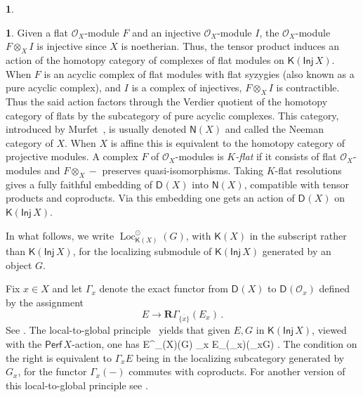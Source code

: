 \documentclass{amsart}
\let\oldequation\equation
\let\oldendequation\endequation
\renewenvironment{equation}{\linenomathNonumbers\oldequation}{\oldendequation\endlinenomath}
\newcommand{\dcat}[2][]{\cat{D}_{#1}(#2)}
\newcommand{\kinj}[1]{\cat{K}(\cat{Inj}\,#1)}
\newcommand{\perf}[1]{\mathsf{Perf}\,#1}
\newcommand{\mco}{\mathcal{O}}
\newcommand{\cat}[1]{{\mathsf{#1}}}
\newcommand{\Loc}{\operatorname{Loc}}
\newcounter{intro}
\theoremstyle{definition}
\newtheorem{chunk}[subsection]{}
\theoremstyle{remark}
\numberwithin{equation}{subsection}
\begin{document}
\begin{chunk}
\begin{chunk}
Given a flat $\mco_X$-module $F$ and an injective $\mco_X$-module $I$, the $\mco_X$-module $F\otimes_XI$ is injective since $X$ is noetherian. Thus, the tensor product induces an action of the homotopy category of complexes of flat modules on $\kinj X$. When $F$ is an acyclic complex of flat modules with flat syzygies (also known as a pure acyclic complex), and $I$ is a complex of injectives, $F\otimes_XI$ is contractible. Thus the said action factors through the Verdier quotient of the homotopy category of flats by the subcategory of pure acyclic complexes. This category, introduced by Murfet~\cite{Murfet:2007, Neeman:2010}, is usually denoted $\cat{N}(X)$ and called the Neeman category of $X$. When $X$ is affine this is equivalent to the homotopy category of projective modules. A complex $F$ of $\mco_X$-modules is \emph{$K$-flat} if it consists of flat $\mco_X$-modules and $F\otimes_X-$ preserves quasi-isomorphisms. Taking $K$-flat resolutions gives a fully faithful embedding of $\dcat X$ into $\cat N(X)$, compatible with tensor products and coproducts. Via this embedding one gets an action of $\dcat X$ on $\kinj X$.

In what follows, we write $\Loc^{\odot}_{\cat K(X)}(G)$, with $\cat K(X)$ in the subscript rather than $\kinj X$, for the localizing submodule of $\kinj X$ generated by an object $G$. 

Fix $x\in X$ and let $\varGamma_x$ denote the exact functor from $\dcat X$ to $\dcat{\mco_x}$ defined by the assignment
\[
E\longrightarrow \mathbf{R}\varGamma_{\overline{\{x\}}}(E_x)\,.
\]
 See \cite[Definition~5.3]{Stevenson:2013a}. The local-to-global principle~\cite[Theorem~6.9]{Stevenson:2013a} yields that given $E,G$ in $\kinj{X}$, viewed with the $\perf X$-action, one has
\begin{equation}
\label{eq:local-global}
E\in \Loc^{\odot}_{\cat K(X)}(G) \Longleftrightarrow
\varGamma_x E\in \Loc_{\cat K(\mco_x)}(\varGamma_xG) \quad {}.
\end{equation}
The condition on the right is equivalent to $\varGamma_xE$ being in the localizing subcategory generated by $G_x$, for the functor $\varGamma_x(-)$ commutes with coproducts. For another version of this local-to-global principle see \cite[Lemma~3.2]{Benson/Iyengar/Krause:2011a}.
\end{chunk}


\end{chunk}
\end{document}
